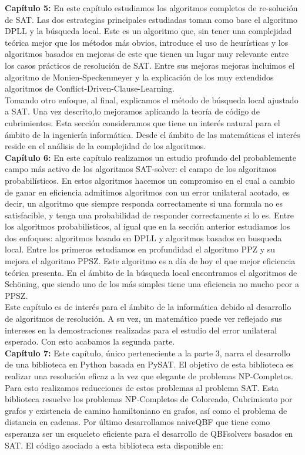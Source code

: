\textbf{Capítulo 5:} En este capítulo estudiamos los algoritmos completos de re-solución de SAT. Las dos estrategias principales estudiadas toman como base el algoritmo DPLL y la búsqueda local. Este es un algoritmo que, sin tener una complejidad teórica mejor que los métodos más obvios, introduce el uso de heurísticas y los algoritmos basados en mejoras de este que tienen un lugar muy relevante entre los casos prácticos de resolución de SAT. Entre sus mejoras mejoras incluimos el algoritmo de Monien-Speckenmeyer y la explicación de los muy extendidos algoritmos de Conflict-Driven-Clause-Learning.\\

Tomando otro enfoque, al final, explicamos el método de búsqueda local ajustado a SAT. Una vez descrito,lo mejoramos aplicando la teoría de código de cubrimientos. Esta sección consideramos que tiene un interés natural para el ámbito de la ingeniería informática. Desde el ámbito de las matemáticas el interés reside en el análisis de la complejidad de los algoritmos.\\

\textbf{Capítulo 6:} En este capítulo realizamos un estudio profundo del probablemente campo más activo de los algoritmos SAT-solver: el campo de los algoritmos probabilísticos. En estos algoritmos hacemos un compromiso en el cual a cambio de ganar en eficiencia admitimos algoritmos con un error unilateral acotado, es decir, un algoritmo que siempre responda correctamente si una formula no es satisfacible, y tenga una probabilidad de responder correctamente si lo es. Entre los algoritmos probabilísticos, al igual que en la sección anterior estudiamos los dos enfoques: algoritmos basado en DPLL y algoritmos basados en busqueda local. Entre los primeros estudiamos en profundidad el algoritmo PPZ y su mejora el algoritmo PPSZ. Este algoritmo es a día de hoy el que mejor eficiencia teórica presenta. En el ámbito de la búsqueda local encontramos el algoritmos de Schöning, que siendo uno de los más simples tiene una eficiencia no mucho peor a PPSZ. \\

Este capítulo es de interés para el ámbito de la informática debido al desarrollo de algoritmos de resolución. A su vez, un matemático puede ver reflejado sus intereses en la demostraciones realizadas para el estudio del error unilateral esperado. Con esto acabamos la segunda parte.\\


\textbf{Capítulo 7:} Este capítulo, único perteneciente a la parte 3, narra el desarrollo de una biblioteca en Python basada en PySAT. El objetivo de esta biblioteca es realizar una resolución eficaz a la vez que elegante de problemas NP-Completos. Para esto realizamos reducciones de estos problemas al problema SAT. Esta biblioteca resuelve los problemas NP-Completos de Coloreado, Cubrimiento por grafos y existencia de camino hamiltoniano en grafos, así como el problema de distancia en cadenas. Por último desarrollamos naiveQBF que tiene como esperanza ser un esqueleto eficiente para el desarrollo de QBFsolvers basados en SAT. El código asociado a esta biblioteca esta disponible en:

